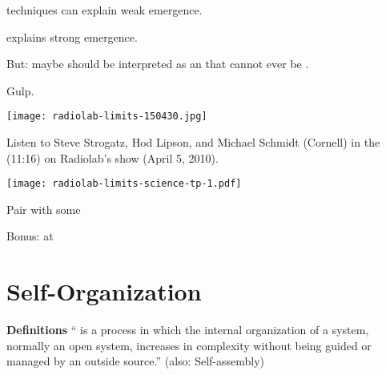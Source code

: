     
       techniques can explain weak emergence.
    
       explains strong emergence.\cite{bedau1997a}
    
      But: maybe  should be interpreted
      as an  that cannot
      ever be .    
    
      Gulp.
    
      
\begin{marginfigure}[]
\texttt{[image: radiolab-limits-150430.jpg]}
\end{marginfigure}

      
      Listen to Steve Strogatz, Hod Lipson, and Michael Schmidt (Cornell) in the 
      (11:16) on Radiolab's show 
       (April 5, 2010).
      
    
    \bigskip
    
\begin{marginfigure}[]
\texttt{[image: radiolab-limits-science-tp-1.pdf]}
\end{marginfigure}


    Pair with some 

    Bonus: 
    at \newline

\section{Self-Organization}
  \textbf{Definitions}
    `` 
    is a process in which the internal organization 
    of a system, normally an open system, increases in complexity without 
    being guided or managed by an outside source.''
    {(also: Self-assembly)}
  \medskip

